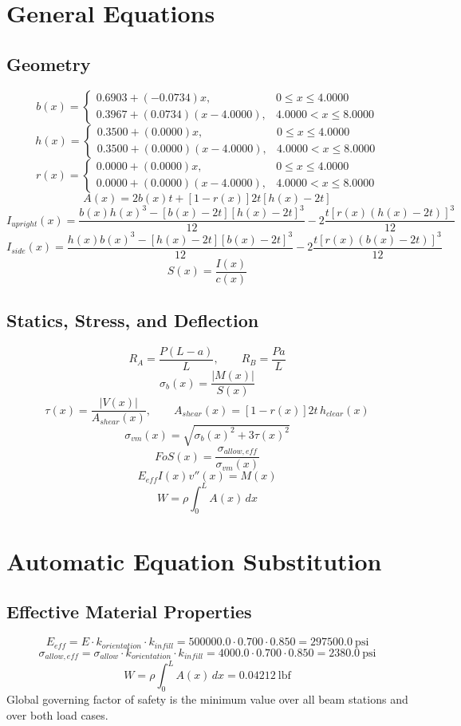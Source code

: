 \documentclass[11pt]{article}
\begin{document}
\section*{General Equations}
\subsection*{Geometry}
\[
b(x)=\begin{cases}0.6903 + (-0.0734)x, & 0 \le x \le 4.0000\\0.3967 + (0.0734)(x-4.0000), & 4.0000 < x \le 8.0000\end{cases}
\]
\[
h(x)=\begin{cases}0.3500 + (0.0000)x, & 0 \le x \le 4.0000\\0.3500 + (0.0000)(x-4.0000), & 4.0000 < x \le 8.0000\end{cases}
\]
\[
r(x)=\begin{cases}0.0000 + (0.0000)x, & 0 \le x \le 4.0000\\0.0000 + (0.0000)(x-4.0000), & 4.0000 < x \le 8.0000\end{cases}
\]
\[
A(x)=2b(x)t+[1-r(x)]2t[h(x)-2t]
\]
\[
I_{upright}(x)=\frac{b(x)h(x)^3-[b(x)-2t][h(x)-2t]^3}{12}-2\frac{t[r(x)(h(x)-2t)]^3}{12}
\]
\[
I_{side}(x)=\frac{h(x)b(x)^3-[h(x)-2t][b(x)-2t]^3}{12}-2\frac{t[r(x)(b(x)-2t)]^3}{12}
\]
\[
S(x)=\frac{I(x)}{c(x)}
\]

\subsection*{Statics, Stress, and Deflection}
\[
R_A=\frac{P(L-a)}{L}, \qquad R_B=\frac{Pa}{L}
\]
\[
\sigma_b(x)=\frac{|M(x)|}{S(x)}
\]
\[
\tau(x)=\frac{|V(x)|}{A_{shear}(x)}, \qquad A_{shear}(x)=[1-r(x)]2t\,h_{clear}(x)
\]
\[
\sigma_{vm}(x)=\sqrt{\sigma_b(x)^2+3\tau(x)^2}
\]
\[
FoS(x)=\frac{\sigma_{allow,eff}}{\sigma_{vm}(x)}
\]
\[
E_{eff}I(x)v''(x)=M(x)
\]
\[
W=\rho\int_0^L A(x)\,dx
\]

\section*{Automatic Equation Substitution}
\subsection*{Effective Material Properties}
\[E_{eff} = E \cdot k_{orientation} \cdot k_{infill} = 500000.0 \cdot 0.700 \cdot 0.850 = 297500.0\ \mathrm{psi}\]
\[\sigma_{allow,eff} = \sigma_{allow} \cdot k_{orientation} \cdot k_{infill} = 4000.0 \cdot 0.700 \cdot 0.850 = 2380.0\ \mathrm{psi}\]
\[W = \rho \int_0^L A(x)\,dx = 0.04212\ \mathrm{lbf}\]
Global governing factor of safety is the minimum value over all beam stations and over both load cases.
\end{document}
